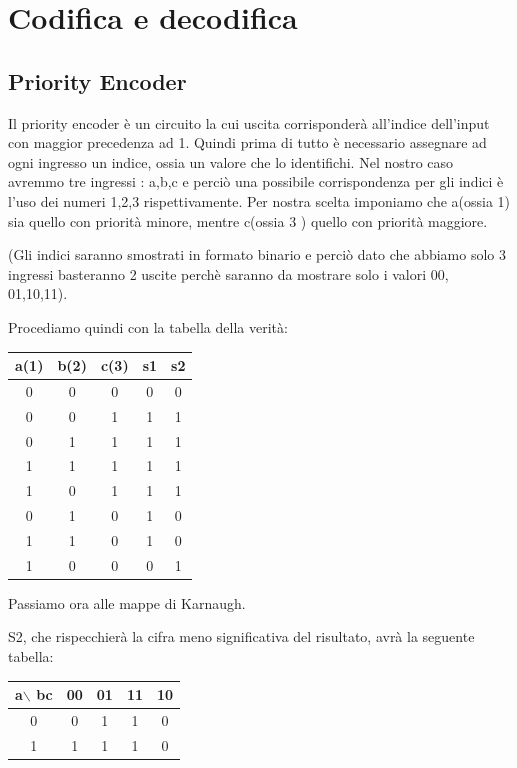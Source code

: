 \documentclass[a4paper]{book}
\begin{document}
\section{Codifica e decodifica}

\subsection{Priority Encoder}

Il priority encoder è un circuito la cui uscita corrisponderà all'indice dell'input con maggior precedenza ad 1. 
Quindi prima di tutto è necessario assegnare ad ogni ingresso un indice, ossia un valore che lo identifichi.
Nel nostro caso avremmo tre ingressi : a,b,c e perciò una possibile corrispondenza per gli indici è l'uso dei numeri 1,2,3 rispettivamente. Per nostra scelta imponiamo che a(ossia 1) sia quello con priorità minore, mentre c(ossia 3 ) quello con priorità maggiore.

(Gli indici saranno smostrati in formato binario e perciò dato che abbiamo solo 3 ingressi basteranno 2 uscite perchè saranno da mostrare solo i valori 00, 01,10,11).

Procediamo quindi con la tabella della verità:

\begin{tabular}{|c|c|c|c|c|}
a(1) & b(2) & c(3) & s1 & s2 \\
\hline
0 & 0 & 0 & 0 & 0 \\
\hline
0 & 0 & 1 & 1 & 1 \\
\hline
0 & 1 & 1 & 1 & 1 \\
\hline
1 & 1 & 1 & 1 & 1 \\
\hline
1 & 0 & 1 & 1 & 1 \\
\hline
0 & 1 & 0 & 1 & 0 \\
\hline
1 & 1 & 0 & 1 & 0 \\
\hline
1 & 0 & 0 & 0 & 1 \\
\hline

\end{tabular}

Passiamo ora alle mappe di Karnaugh.

S2, che rispecchierà la cifra meno significativa del risultato, avrà la seguente tabella:

\begin{tabular}{|c|c|c|c|c|}
a$\backslash$ bc & 00 & 01 & 11 & 10 \\
\hline
0              & 0  & \cellcolor{yellow}1  &  \cellcolor{yellow}1 & 0  \\
\hline
1              & \cellcolor{yellow}1  & \cellcolor{yellow}1  &  \cellcolor{yellow}1 & 0  \\
\hline

\end{tabular}
\end{document}
